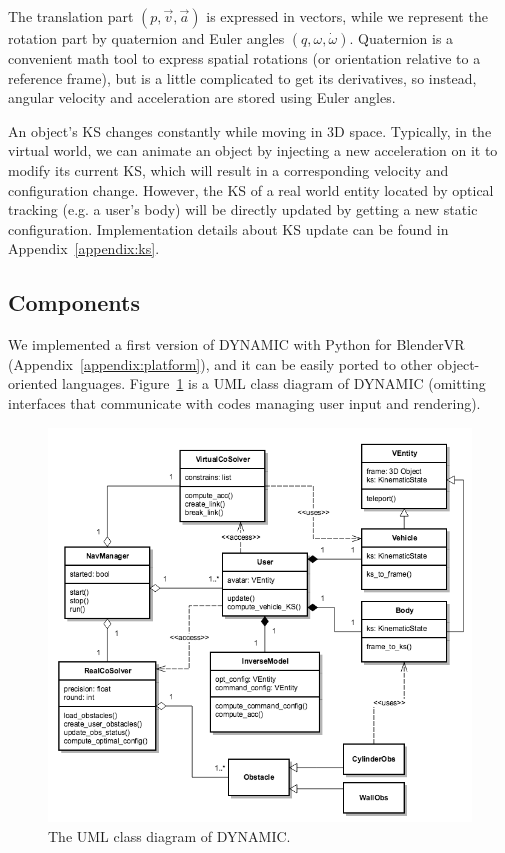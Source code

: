 The translation part $(p,\overrightarrow{v},\overrightarrow{a})$ is expressed in vectors, while we represent the rotation part by quaternion and Euler angles $(q,\omega,\dot{\omega})$. Quaternion is a convenient math tool to express spatial rotations (or orientation relative to a reference frame), but is a little complicated to get its derivatives, so instead, angular velocity and acceleration are stored using Euler angles.

An object's KS changes constantly while moving in 3D space. Typically, in the virtual world, we can animate an object by injecting a new acceleration on it to modify its current KS, which will result in a corresponding velocity and configuration change. However, the KS of a real world entity located by optical tracking (e.g. a user's body) will be directly updated by getting a new static configuration. Implementation details about KS update can be found in Appendix~\ref{appendix:ks}. 


\subsection{Components}
\label{sec:components}
We implemented a first version of DYNAMIC with Python for BlenderVR (Appendix~\ref{appendix:platform}), and it can be easily ported to other object-oriented languages. Figure~\ref{fig:5_uml} is a UML class diagram of DYNAMIC (omitting interfaces that communicate with codes managing user input and rendering).

\begin{figure}[htb]
  \centering
  \includegraphics[width=.9\textwidth]{figures/ch5/uml}
  \caption{\label{fig:5_uml}The UML class diagram of DYNAMIC.}
\end{figure}



